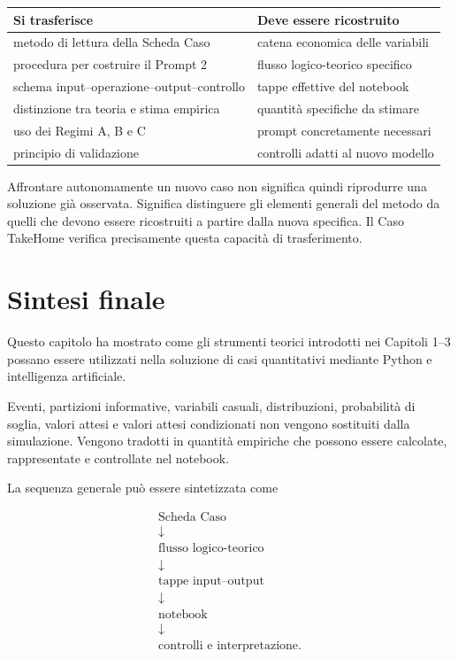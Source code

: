 \begin{center}
\small
\begin{tabular}{p{5.2cm}p{6.6cm}}
\textbf{Si trasferisce} & \textbf{Deve essere ricostruito} \\
\hline
metodo di lettura della Scheda Caso &
catena economica delle variabili \\

procedura per costruire il Prompt 2 &
flusso logico-teorico specifico \\

schema input--operazione--output--controllo &
tappe effettive del notebook \\

distinzione tra teoria e stima empirica &
quantit\`{a} specifiche da stimare \\

uso dei Regimi A, B e C &
prompt concretamente necessari \\

principio di validazione &
controlli adatti al nuovo modello
\end{tabular}
\end{center}

Affrontare autonomamente un nuovo caso non significa quindi riprodurre una
soluzione gi\`{a} osservata. Significa distinguere gli elementi generali del
metodo da quelli che devono essere ricostruiti a partire dalla nuova specifica.
Il Caso TakeHome verifica precisamente questa capacit\`{a} di trasferimento.

\section{Sintesi finale}

Questo capitolo ha mostrato come gli strumenti teorici introdotti nei Capitoli
1--3 possano essere utilizzati nella soluzione di casi quantitativi mediante
Python e intelligenza artificiale.

Eventi, partizioni informative, variabili casuali, distribuzioni,
probabilit\`{a} di soglia, valori attesi e valori attesi condizionati non
vengono sostituiti dalla simulazione. Vengono tradotti in quantit\`{a}
empiriche che possono essere calcolate, rappresentate e controllate nel
notebook.

La sequenza generale pu\`{o} essere sintetizzata come

\[
\begin{array}{c}
\text{Scheda Caso}
\\[3pt]
\downarrow
\\[3pt]
\text{flusso logico-teorico}
\\[3pt]
\downarrow
\\[3pt]
\text{tappe input--output}
\\[3pt]
\downarrow
\\[3pt]
\text{notebook}
\\[3pt]
\downarrow
\\[3pt]
\text{controlli e interpretazione}.
\end{array}
\]

